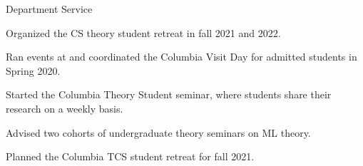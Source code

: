 \documentclass{resume} %
\begin{document}
\begin{rSection}{Department Service}
\begin{rSubsection}{}{}{}

    \item Organized the CS theory student retreat in fall 2021 and 2022.
    \item Ran events at and coordinated the Columbia Visit Day for admitted students in Spring 2020.
    \item Started the Columbia Theory Student seminar, where students share their research on a weekly basis.
    \item Advised two cohorts of undergraduate theory seminars on ML theory.
    \item Planned the Columbia TCS student retreat for fall 2021.
\end{rSubsection}

\end{rSection}
\end{document}
